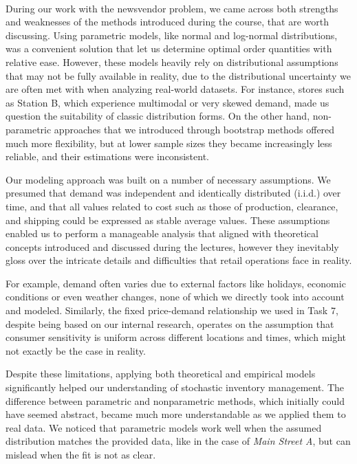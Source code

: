 \paragraph{}
During our work with the newsvendor problem, we came across both strengths and weaknesses of the methods introduced during the course, that are worth discussing. Using parametric models, like normal and log-normal distributions, was a convenient solution that let us determine optimal order quantities with relative ease. However, these models heavily rely on distributional assumptions that may not be fully available in reality, due to the distributional uncertainty we are often met with when analyzing real-world datasets. For instance, stores such as Station B, which experience multimodal or very skewed demand, made us question the suitability of classic distribution forms. On the other hand, non-parametric approaches that we introduced through bootstrap methods offered much more flexibility, but at lower sample sizes they became increasingly less reliable, and their estimations were inconsistent. 


Our modeling approach was built on a number of necessary assumptions. We presumed that demand was independent and identically distributed (i.i.d.) over time, and that all values related to cost such as those of production, clearance, and shipping could be expressed as stable average values. These assumptions enabled us to perform a manageable analysis that aligned with theoretical concepts introduced and discussed during the lectures, however they inevitably gloss over the intricate details and difficulties that retail operations face in reality.

For example, demand often varies due to external factors like holidays, economic conditions or even weather changes, none of which we directly took into account and modeled. Similarly, the fixed price-demand relationship we used in Task 7, despite being based on our internal research, operates on the assumption that consumer sensitivity is uniform across different locations and times, which might not exactly be the case in reality.

Despite these limitations, applying both theoretical and empirical models significantly helped our understanding of stochastic inventory management. The difference between parametric and nonparametric methods, which initially could have seemed abstract, became much more understandable as we applied them to real data. We noticed that parametric models work well when the assumed distribution matches the provided data, like in the case of \emph{Main Street A}, but can mislead when the fit is not as clear.

